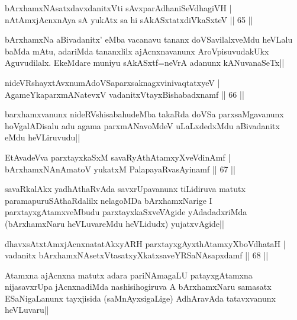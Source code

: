 \begin{shl}
bArxhamxNAsatxdavxdanitxVti sAvxparAdhaniSeVdhagiVH |\\
nA\s \s tAmxjAcnxnAya sA yukAtx sa hi sAkASxtatxdiVkaSxteV \hfill || 65 ||
\end{shl}

\begin{artha}
bArxhamxNa aBivadanitx' eMba vacanavu tananx doVSavilalxveMdu heVLalu baMda mAtu, adariMda tananxlilx ajAcnxnavanunx AroVpisuvudakUkx Aguvudilalx. EkeMdare muniyu sAkASxtf=neVrA adanunx kANuvanaSeTx||
\end{artha}


\begin{shl}
nideVRshayxtAvxnumAdoVSaparxsaknagxvinivaqtatxyeV |\\
AgameYkaparxmANatevxV vadanitxVtayxBishabadxnamf \hfill || 66 ||
\end{shl}

\begin{artha}
barxhamxvanunx nideRVshisabahudeMba takaRda doVSa parxsaMgavanunx hoVgalADisalu adu agama parxmANavoMdeV uLaLxdedxMdu aBivadanitx eMdu heVLiruvudu||
\end{artha}

\begin{shl}
EtAvadeVva parxtayxkaSxM savaRyAthAtamxyXveVdinAmf |\\
bArxhamxNAnAmatoV yukatxM PalapayaRvasAyinamf \hfill || 67 ||
\end{shl}

\begin{artha}
savaRkalAkx yadhAthaRvAda savxrUpavanunx tiLidiruva matutx paramapuruSAthaRdalilx nelagoMDa bArxhamxNarige I parxtayxgAtamxveMbudu parxtayxkaSxveVAgide yAdadadxriMda (bArxhamxNaru heVLuvareMdu heVLidudx) yujatxvAgide||
\end{artha}

\begin{shl}
dhavxsAtxtAmxjAcnxnatatAkxyARH parxtayxgAyxthAtamxyXboVdhataH |\\
vadanitx bArxhamxNAsetxV\s tasatxyXkatxsaveYRSaNAsapxdamf \hfill || 68 ||
\end{shl}

\begin{artha}
Atamxna ajAcnxna matutx adara pariNAmagaLU patayxgAtamxna nijasavxrUpa jAcnxnadiMda nashisihogiruva A bArxhamxNaru samasatx ESaNigaLanunx tayxjisida (saMnAyxsigaLige) AdhAravAda tatavxvanunx heVLuvaru||
\end{artha}

